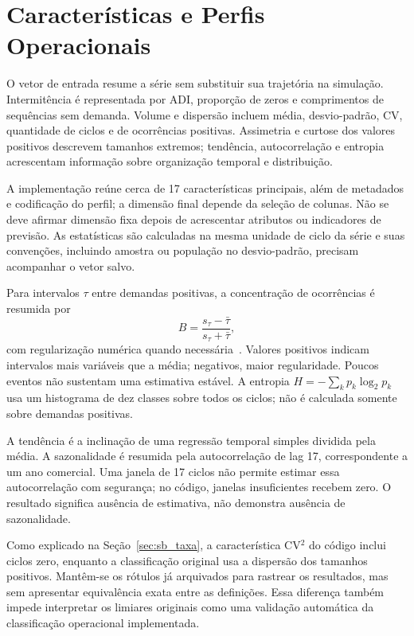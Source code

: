 \section{Características e Perfis Operacionais}
\label{sec:carac_series}

O vetor de entrada resume a série sem substituir sua trajetória na simulação. Intermitência é representada por ADI, proporção de zeros e comprimentos de sequências sem demanda. Volume e dispersão incluem média, desvio-padrão, CV, quantidade de ciclos e de ocorrências positivas. Assimetria e curtose dos valores positivos descrevem tamanhos extremos; tendência, autocorrelação e entropia acrescentam informação sobre organização temporal e distribuição.

A implementação reúne cerca de 17 características principais, além de metadados e codificação do perfil; a dimensão final depende da seleção de colunas. Não se deve afirmar dimensão fixa depois de acrescentar atributos ou indicadores de previsão. As estatísticas são calculadas na mesma unidade de ciclo da série e suas convenções, incluindo amostra ou população no desvio-padrão, precisam acompanhar o vetor salvo.

Para intervalos $\tau$ entre demandas positivas, a concentração de ocorrências é resumida por
\[
B=\frac{s_\tau-\bar\tau}{s_\tau+\bar\tau},
\]
com regularização numérica quando necessária~\citep{GohBarabasi2008Burstiness}. Valores positivos indicam intervalos mais variáveis que a média; negativos, maior regularidade. Poucos eventos não sustentam uma estimativa estável. A entropia $H=-\sum_kp_k\log_2p_k$ usa um histograma de dez classes sobre todos os ciclos; não é calculada somente sobre demandas positivas.

A tendência é a inclinação de uma regressão temporal simples dividida pela média. A sazonalidade é resumida pela autocorrelação de lag 17, correspondente a um ano comercial. Uma janela de 17 ciclos não permite estimar essa autocorrelação com segurança; no código, janelas insuficientes recebem zero. O resultado significa ausência de estimativa, não demonstra ausência de sazonalidade.

Como explicado na Seção~\ref{sec:sb_taxa}, a característica CV$^2$ do código inclui ciclos zero, enquanto a classificação original usa a dispersão dos tamanhos positivos. Mantêm-se os rótulos já arquivados para rastrear os resultados, mas sem apresentar equivalência exata entre as definições. Essa diferença também impede interpretar os limiares originais como uma validação automática da classificação operacional implementada.

